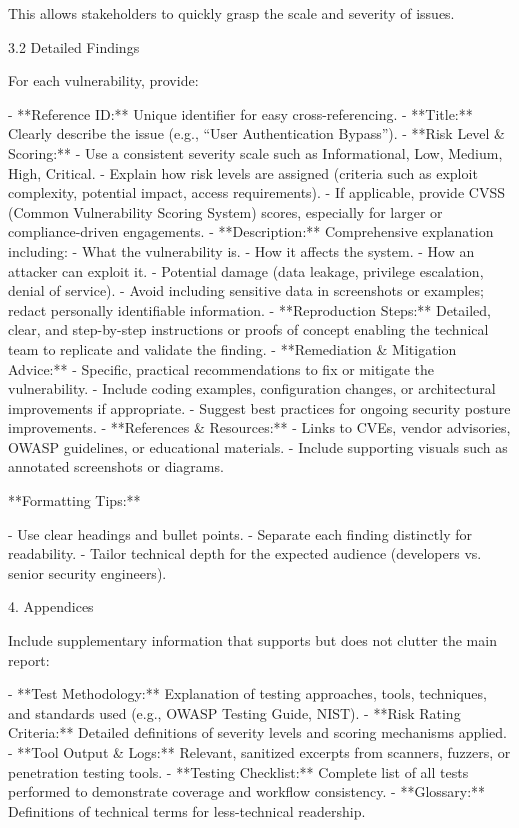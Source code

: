 This allows stakeholders to quickly grasp the scale and severity of issues.

 3.2 Detailed Findings

For each vulnerability, provide:

- **Reference ID:** Unique identifier for easy cross-referencing.
- **Title:** Clearly describe the issue (e.g., “User Authentication Bypass”).
- **Risk Level \& Scoring:**
    - Use a consistent severity scale such as Informational, Low, Medium, High, Critical.
    - Explain how risk levels are assigned (criteria such as exploit complexity, potential impact, access requirements).
    - If applicable, provide CVSS (Common Vulnerability Scoring System) scores, especially for larger or compliance-driven engagements.
- **Description:** Comprehensive explanation including:
    - What the vulnerability is.
    - How it affects the system.
    - How an attacker can exploit it.
    - Potential damage (data leakage, privilege escalation, denial of service).
    - Avoid including sensitive data in screenshots or examples; redact personally identifiable information.
- **Reproduction Steps:** Detailed, clear, and step-by-step instructions or proofs of concept enabling the technical team to replicate and validate the finding.
- **Remediation \& Mitigation Advice:**
    - Specific, practical recommendations to fix or mitigate the vulnerability.
    - Include coding examples, configuration changes, or architectural improvements if appropriate.
    - Suggest best practices for ongoing security posture improvements.
- **References \& Resources:**
    - Links to CVEs, vendor advisories, OWASP guidelines, or educational materials.
    - Include supporting visuals such as annotated screenshots or diagrams.

**Formatting Tips:**

- Use clear headings and bullet points.
- Separate each finding distinctly for readability.
- Tailor technical depth for the expected audience (developers vs. senior security engineers).


4. Appendices

Include supplementary information that supports but does not clutter the main report:

- **Test Methodology:** Explanation of testing approaches, tools, techniques, and standards used (e.g., OWASP Testing Guide, NIST).
- **Risk Rating Criteria:** Detailed definitions of severity levels and scoring mechanisms applied.
- **Tool Output \& Logs:** Relevant, sanitized excerpts from scanners, fuzzers, or penetration testing tools.
- **Testing Checklist:** Complete list of all tests performed to demonstrate coverage and workflow consistency.
- **Glossary:** Definitions of technical terms for less-technical readership.

